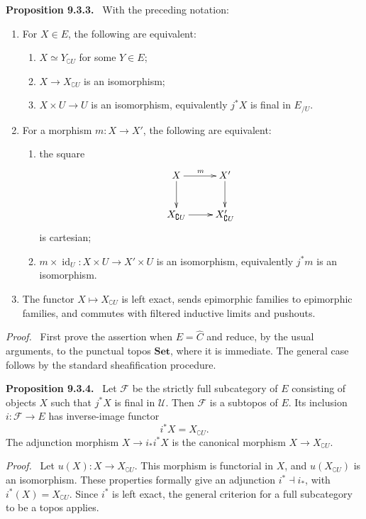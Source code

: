 \documentclass[11pt]{article}
\newcommand{\Uu}{\mathcal{U}}
\newcommand{\Ff}{\mathcal{F}}
\newcommand{\Set}{\mathbf{Set}}
\newcommand{\id}{\operatorname{id}}
\newenvironment{statement}[1]{\par\medskip\noindent\textbf{#1.}\ }{\par\medskip}
\newenvironment{prooftext}{\par\noindent\emph{Proof.}\ }{\par\medskip}
\begin{document}
\begin{statement}{Proposition 9.3.3}
With the preceding notation:
\begin{enumerate}[label=\alph*)]
\item For \(X\in E\), the following are equivalent:
\begin{enumerate}[label=(\roman*)]
\item \(X\simeq Y_{\complement U}\) for some \(Y\in E\);
\item \(X\to X_{\complement U}\) is an isomorphism;
\item \(X\times U\to U\) is an isomorphism, equivalently \(j^*X\) is final in \(E_{/U}\).
\end{enumerate}
\item For a morphism \(m:X\to X'\), the following are equivalent:
\begin{enumerate}[label=(\roman*')]
\item the square
\[
\xymatrix{X\ar[r]^m\ar[d]&X'\ar[d]\\
X_{\complement U}\ar[r]&X'_{\complement U}}
\]
is cartesian;
\item \(m\times\id_U:X\times U\to X'\times U\) is an isomorphism, equivalently \(j^*m\) is an isomorphism.
\end{enumerate}
\item The functor \(X\mapsto X_{\complement U}\) is left exact, sends epimorphic families to epimorphic families, and commutes with filtered inductive limits and pushouts.
\end{enumerate}
\end{statement}

\begin{prooftext}
First prove the assertion when \(E=\widehat C\) and reduce, by the usual arguments, to the punctual topos \(\Set\), where it is immediate. The general case follows by the standard sheafification procedure.
\end{prooftext}

\begin{statement}{Proposition 9.3.4}
Let \(\Ff\) be the strictly full subcategory of \(E\) consisting of objects \(X\) such that \(j^*X\) is final in \(\Uu\). Then \(\Ff\) is a subtopos of \(E\). Its inclusion \(i:\Ff\to E\) has inverse-image functor
\[
i^*X=X_{\complement U}.
\]
The adjunction morphism \(X\to i_*i^*X\) is the canonical morphism \(X\to X_{\complement U}\).
\end{statement}

\begin{prooftext}
Let \(u(X):X\to X_{\complement U}\). This morphism is functorial in \(X\), and \(u(X_{\complement U})\) is an isomorphism. These properties formally give an adjunction \(i^*\dashv i_*\), with \(i^*(X)=X_{\complement U}\). Since \(i^*\) is left exact, the general criterion for a full subcategory to be a topos applies.
\end{prooftext}
\end{document}
